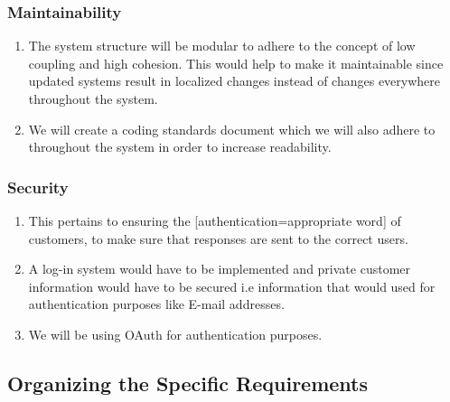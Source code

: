 \documentclass[11pt]{article}
\begin{document}
\subsubsection{Maintainability}
\begin{enumerate}
	\item The system structure will be modular to adhere to the concept of low coupling and high cohesion. This would help to make it maintainable since updated systems result in localized changes instead of changes everywhere throughout the system.
	\item We will create a coding standards document which we will also adhere to throughout the system in order to increase readability.
\end{enumerate}

\subsubsection{Security}
\begin{enumerate}
	\item This pertains to ensuring the [authentication=appropriate word] of customers, to make sure that responses are sent to the correct users.
	\item A log-in system would have to be implemented and private customer information would have to be secured i.e information that would used for authentication purposes like E-mail addresses.
	\item We will be using OAuth for authentication purposes.
\end{enumerate}

\subsection{Organizing the Specific Requirements}
\end{document}
